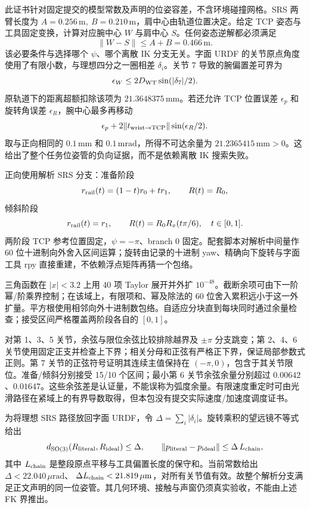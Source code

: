\documentclass[11pt,a4paper]{article}
\theoremstyle{cn}
\newcommand{\mm}{\,\mathrm{mm}}
\begin{document}
此证书针对固定提交的模型常数及声明的位姿容差，不含环境碰撞网格。SRS 两臂长度为
\(A=0.256\,\mathrm m,\ B=0.210\,\mathrm m\)，肩中心由轨道位置决定。给定 TCP 姿态与工具固定变换，计算对应腕中心 \(W\) 与肩中心 \(S\)。任何姿态逆解都必须满足
\[
\|W-S\|\le A+B=0.466\,\mathrm m.
\]
该必要条件与选择哪个 \(\psi\)、哪个离散 IK 分支无关。字面 URDF 的关节原点角度使用了有限小数，与理想四分之一圈相差 \(\delta_i\)。关节 7 导致的腕偏置差可界为
\[
\epsilon_W\le2D_{\rm WT}\sin(|\delta_7|/2).
\]
原轨道下的距离超额扣除该项为 \(21.3648375\mm\)。若还允许 TCP 位置误差 \(\epsilon_p\) 和旋转角误差 \(\epsilon_R\)，腕中心最多再移动
\[
\epsilon_p+2\|t_{\rm wrist\to TCP}\|\sin(\epsilon_R/2).
\]
取与正向相同的 \(0.1\mm\) 和 \(0.1\,\mathrm{mrad}\)，所得不可达余量为 \(21.2365415\mm>0\)。这给出了整个任务位姿管的负向证据，而不是依赖离散 IK 搜索失败。

正向使用解析 SRS 分支：准备阶段
\[
r_{\rm rail}(t)=(1-t)r_0+tr_1,\qquad R(t)=R_0,
\]
倾斜阶段
\[
r_{\rm rail}(t)=r_1,\qquad R(t)=R_0R_x(t\pi/6),
\quad t\in[0,1].
\]
两阶段 TCP 参考位置固定，\(\psi=-\pi\)、branch \(0\) 固定。配套脚本对解析中间量作 60 位十进制向外舍入区间运算；旋转由记录的十进制 yaw、精确向下旋转与字面工具 rpy 直接重建，不依赖浮点矩阵再猜一个包络。

三角函数在 \(|x|<3.2\) 上用 40 项 Taylor 展开并外扩 \(10^{-48}\)。截断余项可由下一阶幂/阶乘界控制；在该域上，有限项和、幂及除法的 60 位舍入累积远小于这一外扩量。平方根使用相邻向外十进制数包络。自适应分块直到每块同时通过余量检查；接受区间严格覆盖两阶段各自的 \([0,1]\)。

对第 1、3、5 关节，余弦与限位余弦比较排除越界及 \(\pm\pi\) 分支跳变；第 2、4、6 关节使用固定正支并检查上下界；相关分母和正弦有严格正下界，保证局部参数式正则。第 7 关节的正弦符号证明其连续主值保持在 \((-\pi,0)\)，包含于其关节限位。准备/倾斜分别接受 15/10 个区间；最小第 6 关节余弦余量分别超过 \(0.00642\)、\(0.01647\)。这些余弦差是认证量，不能误称为弧度余量。有限速度重定时可由光滑路径在紧域上的有界导数取得，但本包没有提交实际速度/加速度调度证书。

为将理想 SRS 路径放回字面 URDF，令
\(\Delta=\sum_i|\delta_i|\)。旋转乘积的望远镜不等式给出
\[
d_{\rm SO(3)}(R_{\rm literal},R_{\rm ideal})\le\Delta,
\qquad
\|p_{\rm literal}-p_{\rm ideal}\|
\le\Delta\,L_{\rm chain},
\]
其中 \(L_{\rm chain}\) 是整段原点平移与工具偏置长度的保守和。当前常数给出
\(\Delta<22.040\,\mu\mathrm{rad}\)、
\(\Delta L_{\rm chain}<21.819\,\mu\mathrm m\)，对所有关节值有效。故整个解析分支满足正文声明的同一位姿管。其几何环境、接触与声窗仍须真实验收，不能由上述 FK 界推出。
\end{document}
